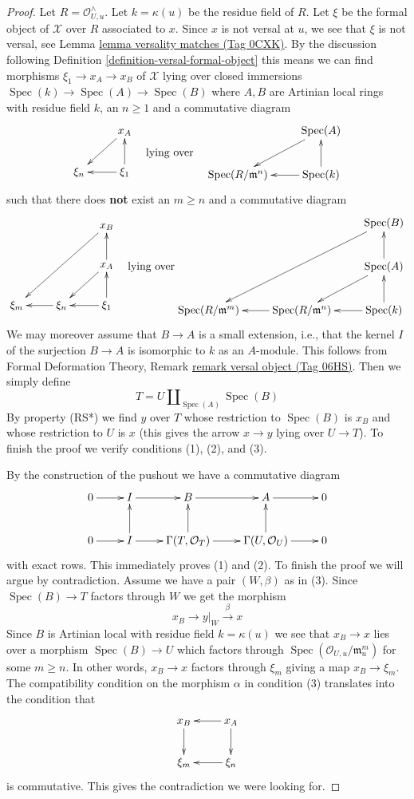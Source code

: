 \documentclass{amsart}
\theoremstyle{plain}
\theoremstyle{definition}
\theoremstyle{remark}
\numberwithin{equation}{subsection}
\def\Spec{\mathop{\mathrm{Spec}}}
\begin{document}
\begin{proof}
Let $R = \mathcal{O}_{U, u}^\wedge$. Let $k = \kappa(u)$
be the residue field of $R$. Let $\xi$ be the formal object
of $\mathcal{X}$ over $R$ associated to $x$. Since $x$ is not
versal at $u$, we see that $\xi$ is not versal, see
Lemma \href{https://stacks.math.columbia.edu/tag/0CXK}{lemma versality matches (Tag 0CXK)}. By the discussion following
Definition \ref{definition-versal-formal-object}
this means we can find
morphisms $\xi_1 \to x_A \to x_B$ of $\mathcal{X}$ lying over
closed immersions $\Spec(k) \to \Spec(A) \to \Spec(B)$
where $A, B$ are Artinian local rings with residue field $k$,
an $n \geq 1$ and a commutative diagram
$$
\vcenter{
\xymatrix{
& x_A \ar[ld] \\
\xi_n & \xi_1 \ar[u] \ar[l]
}
}
\quad\text{lying over}\quad
\vcenter{
\xymatrix{
& \Spec(A) \ar[ld] \\
\Spec(R/\mathfrak m^n) & \Spec(k) \ar[u] \ar[l]
}
}
$$
such that there does {\bf not} exist an $m \geq n$ and a commutative diagram
$$
\vcenter{
\xymatrix{
& & x_B \ar[lldd] \\
& & x_A \ar[ld] \ar[u] \\
\xi_m & \xi_n \ar[l] & \xi_1 \ar[u] \ar[l]
}
}
\quad\text{lying over}
\vcenter{
\xymatrix{
& & \Spec(B) \ar[lldd] \\
& & \Spec(A) \ar[ld] \ar[u] \\
\Spec(R/\mathfrak m^m) &
\Spec(R/\mathfrak m^n) \ar[l] &
\Spec(k) \ar[u] \ar[l]
}
}
$$
We may moreover assume that $B \to A$ is a small
extension, i.e., that the kernel $I$ of the surjection $B \to A$
is isomorphic to $k$ as an $A$-module.
This follows from Formal Deformation Theory, Remark
\href{https://stacks.math.columbia.edu/tag/06HS}{remark versal object (Tag 06HS)}.
Then we simply define
$$
T = U \amalg_{\Spec(A)} \Spec(B)
$$
By property (RS*) we find $y$ over $T$ whose restriction to
$\Spec(B)$ is $x_B$ and whose restriction to $U$ is $x$
(this gives the arrow $x \to y$ lying over $U \to T$).
To finish the proof we verify conditions (1), (2), and (3).

\medskip\noindent
By the construction of the pushout we have a commutative diagram
$$
\xymatrix{
0 \ar[r] &
I \ar[r] &
B \ar[r] &
A \ar[r] &
0 \\
0 \ar[r] &
I \ar[r] \ar[u] &
\Gamma(T, \mathcal{O}_T) \ar[r] \ar[u] &
\Gamma(U, \mathcal{O}_U) \ar[r] \ar[u] &
0
}
$$
with exact rows. This immediately proves (1) and (2).
To finish the proof we will argue by contradiction.
Assume we have a pair $(W, \beta)$ as in (3).
Since $\Spec(B) \to T$ factors through $W$ we get the morphism
$$
x_B \to y|_W \xrightarrow{\beta} x
$$
Since $B$ is Artinian local with residue field $k = \kappa(u)$
we see that $x_B \to x$ lies over a morphism $\Spec(B) \to U$
which factors through $\Spec(\mathcal{O}_{U, u}/\mathfrak m_u^m)$
for some $m \geq n$. In other words, $x_B \to x$ factors
through $\xi_m$ giving a map $x_B \to \xi_m$.
The compatibility condition on the morphism $\alpha$
in condition (3) translates into the condition that
$$
\xymatrix{
x_B \ar[d] & x_A \ar[d] \ar[l] \\
\xi_m & \xi_n \ar[l]
}
$$
is commutative. This gives the contradiction we were looking for.
\end{proof}
\end{document}
